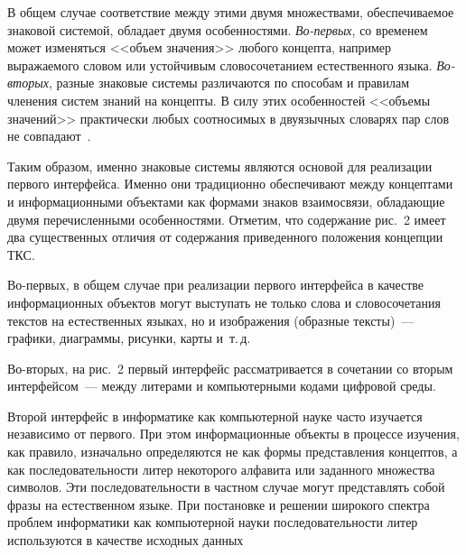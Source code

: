 \begin{multicols}{2}
   В общем случае соответствие между этими двумя множествами, обеспечиваемое 
знаковой системой, обладает двумя особенностями. \textit{Во-первых}, со временем может 
изменяться <<объем значения>> любого концепта, например выражаемого словом или 
устойчивым словосочетанием естественного языка. \textit{Во-вторых}, разные знаковые 
системы различаются по способам и правилам членения систем знаний на концепты. В силу 
этих особенностей <<объемы значений>> практически любых соотносимых в двуязычных 
словарях пар слов не совпадают~\cite{35zat}.
   
   Таким образом, именно знаковые системы являются основой для реализации первого 
интерфейса. Именно они традиционно обеспечивают между концептами и 
информационными объектами как формами знаков взаимосвязи, обладающие двумя 
перечисленными особенностями. Отметим, что содержание рис.~2 имеет два 
существенных отличия от содержания приведенного положения концепции ТКС.
   
   Во-первых, в общем случае при реализации первого интерфейса в качестве 
информационных\linebreak
объектов могут выступать не только слова и словосочетания текстов на 
естественных языках, но и изображения (образные тексты)~--- графики, диаграммы, рисунки, 
карты и~т.\,д.
   
   Во-вторых, на рис.~2 первый интерфейс рас\-смат\-ри\-ва\-ет\-ся в сочетании со вторым 
интерфейсом~--- между литерами и компьютерными кодами цифровой среды.
   
   Второй интерфейс в информатике как компьютерной науке часто изучается независимо 
от первого. При этом информационные объекты в\linebreak
 процессе изучения, как правило, 
изначально определяются не как формы представления концептов, а как последовательности 
литер некоторого алфавита или заданного множества символов. Эти последовательности в 
частном случае могут представлять собой фразы на естественном языке. 
При постановке и решении 
широкого спектра проблем информатики 
как  компьютерной науки последовательности литер используются в качестве исходных данных  
\linebreak\vspace*{-12pt}

\pagebreak

\end{multicols}

\begin{figure} %
\vspace*{1pt}
\begin{center}
\vspace*{1pt}
\mbox{%
\epsfxsize=163.053mm
}
\end{center}
\vspace*{-9pt}
\end{figure}

